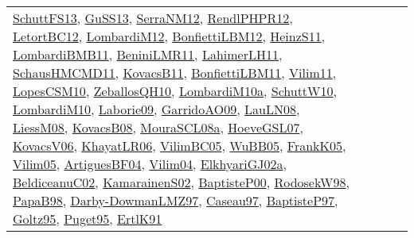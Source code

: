 {\begin{longtable}{lp{3cm}>{\raggedright}p{6cm}>{\raggedright}p{6cm}p{8cm}}
\href{papers/SchuttFS13.pdf}{SchuttFS13}\cite{SchuttFS13}, \href{papers/GuSS13.pdf}{GuSS13}\cite{GuSS13}, \href{papers/SerraNM12.pdf}{SerraNM12}\cite{SerraNM12}, \href{papers/RendlPHPR12.pdf}{RendlPHPR12}\cite{RendlPHPR12}, \href{papers/LetortBC12.pdf}{LetortBC12}\cite{LetortBC12}, \href{articles/LombardiM12.pdf}{LombardiM12}\cite{LombardiM12}, \href{papers/BonfiettiLBM12.pdf}{BonfiettiLBM12}\cite{BonfiettiLBM12}, \href{papers/HeinzS11.pdf}{HeinzS11}\cite{HeinzS11}, \href{papers/LombardiBMB11.pdf}{LombardiBMB11}\cite{LombardiBMB11}, \href{articles/BeniniLMR11.pdf}{BeniniLMR11}\cite{BeniniLMR11}, \href{papers/LahimerLH11.pdf}{LahimerLH11}\cite{LahimerLH11}, \href{articles/SchausHMCMD11.pdf}{SchausHMCMD11}\cite{SchausHMCMD11}, \href{articles/KovacsB11.pdf}{KovacsB11}\cite{KovacsB11}, \href{papers/BonfiettiLBM11.pdf}{BonfiettiLBM11}\cite{BonfiettiLBM11}, \href{papers/Vilim11.pdf}{Vilim11}\cite{Vilim11}, \href{articles/LopesCSM10.pdf}{LopesCSM10}\cite{LopesCSM10}, \href{articles/ZeballosQH10.pdf}{ZeballosQH10}\cite{ZeballosQH10}, \href{articles/LombardiM10a.pdf}{LombardiM10a}\cite{LombardiM10a}, \href{papers/SchuttW10.pdf}{SchuttW10}\cite{SchuttW10}, \href{papers/LombardiM10.pdf}{LombardiM10}\cite{LombardiM10}, \href{papers/Laborie09.pdf}{Laborie09}\cite{Laborie09}, \href{articles/GarridoAO09.pdf}{GarridoAO09}\cite{GarridoAO09}, \href{papers/LauLN08.pdf}{LauLN08}\cite{LauLN08}, \href{articles/LiessM08.pdf}{LiessM08}\cite{LiessM08}, \href{articles/KovacsB08.pdf}{KovacsB08}\cite{KovacsB08}, \href{papers/MouraSCL08a.pdf}{MouraSCL08a}\cite{MouraSCL08a}, \href{papers/HoeveGSL07.pdf}{HoeveGSL07}\cite{HoeveGSL07}, \href{papers/KovacsV06.pdf}{KovacsV06}\cite{KovacsV06}, \href{articles/KhayatLR06.pdf}{KhayatLR06}\cite{KhayatLR06}, \href{articles/VilimBC05.pdf}{VilimBC05}\cite{VilimBC05}, \href{papers/WuBB05.pdf}{WuBB05}\cite{WuBB05}, \href{papers/FrankK05.pdf}{FrankK05}\cite{FrankK05}, \href{papers/Vilim05.pdf}{Vilim05}\cite{Vilim05}, \href{papers/ArtiguesBF04.pdf}{ArtiguesBF04}\cite{ArtiguesBF04}, \href{papers/Vilim04.pdf}{Vilim04}\cite{Vilim04}, \href{papers/ElkhyariGJ02a.pdf}{ElkhyariGJ02a}\cite{ElkhyariGJ02a}, \href{papers/BeldiceanuC02.pdf}{BeldiceanuC02}\cite{BeldiceanuC02}, \href{papers/KamarainenS02.pdf}{KamarainenS02}\cite{KamarainenS02}, \href{articles/BaptisteP00.pdf}{BaptisteP00}\cite{BaptisteP00}, \href{papers/RodosekW98.pdf}{RodosekW98}\cite{RodosekW98}, \href{articles/PapaB98.pdf}{PapaB98}\cite{PapaB98}, \href{articles/Darby-DowmanLMZ97.pdf}{Darby-DowmanLMZ97}\cite{Darby-DowmanLMZ97}, \href{papers/Caseau97.pdf}{Caseau97}\cite{Caseau97}, \href{papers/BaptisteP97.pdf}{BaptisteP97}\cite{BaptisteP97}, \href{papers/Goltz95.pdf}{Goltz95}\cite{Goltz95}, \href{papers/Puget95.pdf}{Puget95}\cite{Puget95}, \href{papers/ErtlK91.pdf}{ErtlK91}\cite{ErtlK91}\\

\end{longtable}}
